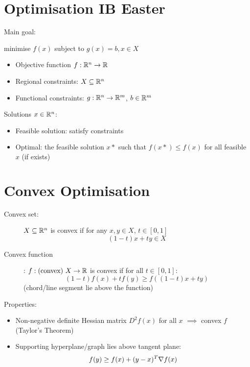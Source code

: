 



\section*{Optimisation \hfill IB Easter}


Main goal: \\
\begin{center}
    minimise $f(x)$ subject to $g(x) = b, x \in X$
\end{center}
\begin{itemize}
    \item Objective function $f: \mathbb{R}^n \to \mathbb{R}$
    \item Regional constraints: $X \subseteq \mathbb{R}^n$
    \item Functional constraints: $g: \mathbb{R}^n \to \mathbb{R}^m $, $b \in \mathbb{R}^m$
\end{itemize}

Solutions $x \in \mathbb{R}^n$:
\begin{itemize}
    \item Feasible solution: satisfy constraints
    \item Optimal: the feasible solution $x*$ such that $f(x*) \leq f(x)$ for all feasible $x$ (if exists)
\end{itemize}


\section{Convex Optimisation}


\begin{description}
    \item[Convex set:] $X \subseteq\mathbb{R}^n$ is convex if for any $x,y \in X$, $t \in [0,1]$
          \[(1-t)x + ty \in X\]
    \item[Convex function]: $f : \text{(convex) } X \to \mathbb{R}$ is convex if for all $t \in [0,1]$: \[(1-t)f(x) + tf(y) \geq f((1-t)x + ty)\]
          (chord/line segment lie above the function)
\end{description}

Properties:
\begin{itemize}
    \item Non-negative definite Hessian matrix $D^2f(x)$ for all $x$ $\implies$ convex $f$ (Taylor's Theorem)
    \item Supporting hyperplane/graph lies above tangent plane:
          \[ f(y) \geq f(x) + (y-x)^T \mathbf{\nabla} f(x) \]
\end{itemize}

